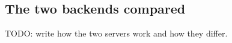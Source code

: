 \documentclass[11pt]{article}
\begin{document}
\subsection{The two backends compared}
TODO: write how the two servers work and how they differ.
\end{document}
